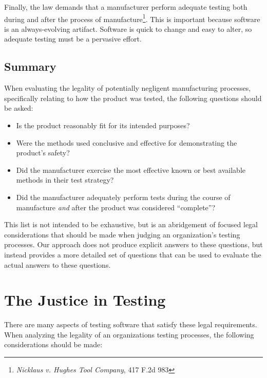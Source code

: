 Finally, the law demands that a manufacturer perform adequate testing both
during and after the process of manufacture\footnote{\textit{Nicklaus v. Hughes
Tool Company}, 417 F.2d 983}. This is important because software is an
always-evolving artifact. Software is quick to change and easy to alter, so
adequate testing must be a pervasive effort.

\subsection{Summary}
When evaluating the legality of potentially negligent manufacturing processes,
specifically relating to how the product was tested, the following questions
should be asked:

\singlespace
\begin{itemize}
  \item Is the product reasonably fit for its intended purposes?
  \item Were the methods used conclusive and effective for demonstrating the
  product's safety?
  \item Did the manufacturer exercise the most effective known or best available
  methods in their test strategy?
  \item Did the manufacturer adequately perform tests during the course of
  manufacture \textit{and} after the product was considered ``complete''?
\end{itemize}
\doublespace

This list is not intended to be exhaustive, but is an abridgement of focused
legal considerations that should be made when judging an organization's testing
processes. Our approach does not produce explicit answers to these questions,
but instead provides a more detailed set of questions that can be used to
evaluate the actual answers to these questions.

\section{The Justice in Testing}

There are many aspects of testing software that satisfy these legal
requirements. When analyzing the legality of an organizations testing processes,
the following considerations should be made:

